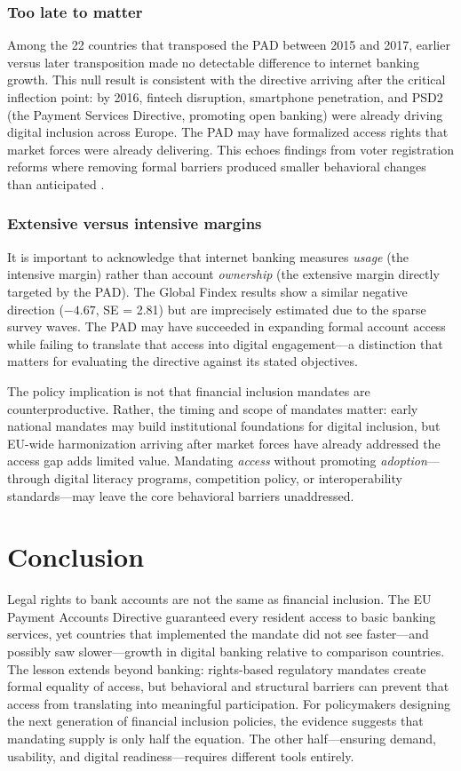 \documentclass[12pt]{article}
\begin{document}
\subsubsection*{Too late to matter} Among the 22 countries that transposed the PAD between 2015 and 2017, earlier versus later transposition made no detectable difference to internet banking growth. This null result is consistent with the directive arriving after the critical inflection point: by 2016, fintech disruption, smartphone penetration, and PSD2 (the Payment Services Directive, promoting open banking) were already driving digital inclusion across Europe. The PAD may have formalized access rights that market forces were already delivering. This echoes findings from voter registration reforms where removing formal barriers produced smaller behavioral changes than anticipated \citep{cantoni2020persistent}.

\subsubsection*{Extensive versus intensive margins} It is important to acknowledge that internet banking measures \emph{usage} (the intensive margin) rather than account \emph{ownership} (the extensive margin directly targeted by the PAD). The Global Findex results show a similar negative direction ($-4.67$, SE = 2.81) but are imprecisely estimated due to the sparse survey waves. The PAD may have succeeded in expanding formal account access while failing to translate that access into digital engagement---a distinction that matters for evaluating the directive against its stated objectives.

The policy implication is not that financial inclusion mandates are counterproductive. Rather, the timing and scope of mandates matter: early national mandates may build institutional foundations for digital inclusion, but EU-wide harmonization arriving after market forces have already addressed the access gap adds limited value. Mandating \emph{access} without promoting \emph{adoption}---through digital literacy programs, competition policy, or interoperability standards---may leave the core behavioral barriers unaddressed.


\section{Conclusion}
\label{sec:conclusion}

Legal rights to bank accounts are not the same as financial inclusion. The EU Payment Accounts Directive guaranteed every resident access to basic banking services, yet countries that implemented the mandate did not see faster---and possibly saw slower---growth in digital banking relative to comparison countries. The lesson extends beyond banking: rights-based regulatory mandates create formal equality of access, but behavioral and structural barriers can prevent that access from translating into meaningful participation. For policymakers designing the next generation of financial inclusion policies, the evidence suggests that mandating supply is only half the equation. The other half---ensuring demand, usability, and digital readiness---requires different tools entirely.
\end{document}
